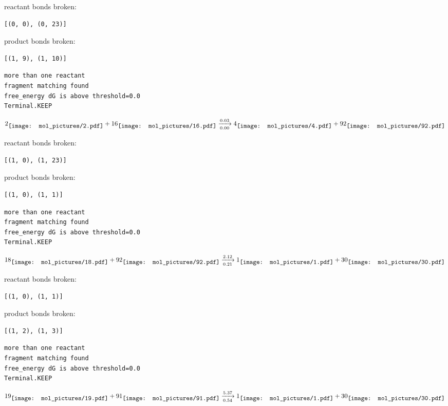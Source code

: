 \documentclass{article}
\begin{document}
reactant bonds broken:\begin{verbatim}
[(0, 0), (0, 23)]
\end{verbatim}
product bonds broken:\begin{verbatim}
[(1, 9), (1, 10)]
\end{verbatim}




\vspace{1cm}
\begin{verbatim}
more than one reactant
fragment matching found
free_energy dG is above threshold=0.0
Terminal.KEEP
\end{verbatim}
$$
2
\raisebox{-.5\height}{\texttt{[image: mol\_pictures/2.pdf]}}
+
16
\raisebox{-.5\height}{\texttt{[image: mol\_pictures/16.pdf]}}
\xrightarrow[0.00]{0.03}
4
\raisebox{-.5\height}{\texttt{[image: mol\_pictures/4.pdf]}}
+
92
\raisebox{-.5\height}{\texttt{[image: mol\_pictures/92.pdf]}}
$$


reactant bonds broken:\begin{verbatim}
[(1, 0), (1, 23)]
\end{verbatim}
product bonds broken:\begin{verbatim}
[(1, 0), (1, 1)]
\end{verbatim}




\vspace{1cm}
\begin{verbatim}
more than one reactant
fragment matching found
free_energy dG is above threshold=0.0
Terminal.KEEP
\end{verbatim}
$$
18
\raisebox{-.5\height}{\texttt{[image: mol\_pictures/18.pdf]}}
+
92
\raisebox{-.5\height}{\texttt{[image: mol\_pictures/92.pdf]}}
\xrightarrow[0.21]{2.12}
1
\raisebox{-.5\height}{\texttt{[image: mol\_pictures/1.pdf]}}
+
30
\raisebox{-.5\height}{\texttt{[image: mol\_pictures/30.pdf]}}
$$


reactant bonds broken:\begin{verbatim}
[(1, 0), (1, 1)]
\end{verbatim}
product bonds broken:\begin{verbatim}
[(1, 2), (1, 3)]
\end{verbatim}




\vspace{1cm}
\begin{verbatim}
more than one reactant
fragment matching found
free_energy dG is above threshold=0.0
Terminal.KEEP
\end{verbatim}
$$
19
\raisebox{-.5\height}{\texttt{[image: mol\_pictures/19.pdf]}}
+
91
\raisebox{-.5\height}{\texttt{[image: mol\_pictures/91.pdf]}}
\xrightarrow[0.54]{5.37}
1
\raisebox{-.5\height}{\texttt{[image: mol\_pictures/1.pdf]}}
+
30
\raisebox{-.5\height}{\texttt{[image: mol\_pictures/30.pdf]}}
$$
\end{document}
